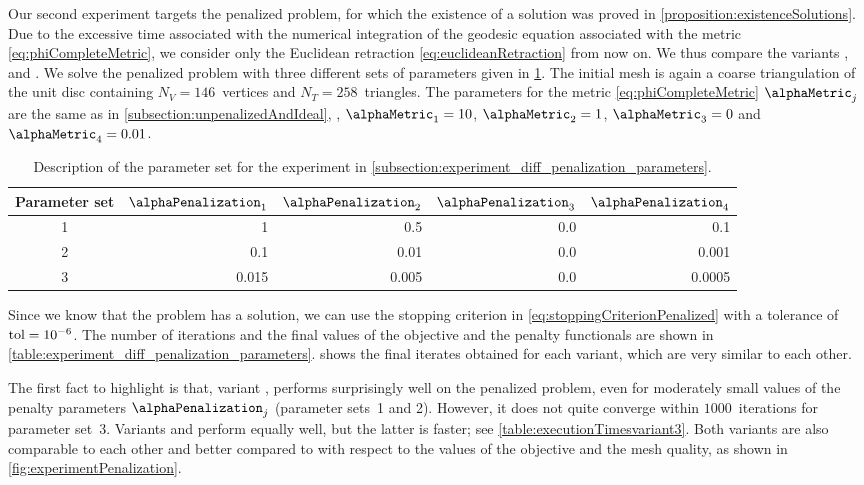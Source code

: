 Our second experiment targets the penalized problem, for which the existence of a solution was proved in \cref{proposition:existenceSolutions}.
Due to the excessive time associated with the numerical integration of the geodesic equation associated with the metric \eqref{eq:phiCompleteMetric}, we consider only the Euclidean retraction \eqref{eq:euclideanRetraction} from now on.
We thus compare the variants \EucEuc, \ElasEuc and \CompEuc.
We solve the penalized problem with three different sets of parameters given in \cref{tab:parametersExpTwo}.
The initial mesh is again a coarse triangulation of the unit disc containing $N_V = 146$~vertices and $N_T = 258$~triangles.
The parameters for the metric \eqref{eq:phiCompleteMetric} $\alphaMetric_j$ are the same as in \cref{subsection:unpenalizedAndIdeal}, \ie, $\alphaMetric_1 = 10$, $\alphaMetric_2 = 1 $, $\alphaMetric_3 = 0$ and $\alphaMetric_4 = 0.01$.

\begin{table}[htp]
	\centering
	\begin{tabular}{c|rrrr}
		\toprule
		Parameter set & $\alphaPenalization_1$ & $\alphaPenalization_2$ & $\alphaPenalization_3$ & $\alphaPenalization_4$
		\\
		\midrule
		1 & 1 & 0.5 & 0.0 & 0.1
		\\
		2 & 0.1 & 0.01 & 0.0 & 0.001
		\\
		3 & 0.015 & 0.005 & 0.0 & 0.0005
		\\
		\bottomrule
	\end{tabular}
	\caption{Description of the parameter set for the experiment in \cref{subsection:experiment_diff_penalization_parameters}.}
	\label{tab:parametersExpTwo}
\end{table}

Since we know that the problem has a solution, we can use the stopping criterion in \eqref{eq:stoppingCriterionPenalized} with a tolerance of $\textup{tol} = 10^{-6}$.
The number of iterations and the final values of the objective and the penalty functionals are shown in \cref{table:experiment_diff_penalization_parameters}.
 shows the final iterates obtained for each variant, which are very similar to each other.

The first fact to highlight is that, variant \EucEuc, performs surprisingly well on the penalized problem, even for moderately small values of the penalty parameters $\alphaPenalization_j$ (parameter sets~1 and 2).
However, it does not quite converge within $1000$~iterations for parameter set~3.
Variants \ElasEuc and \CompEuc perform equally well, but the latter is faster; see \cref{table:executionTimesvariant3}.
Both variants are also comparable to each other and better compared to \EucEuc with respect to the values of the objective and the mesh quality, as shown in \cref{fig:experimentPenalization}.

